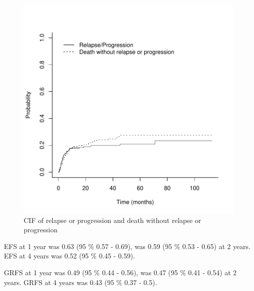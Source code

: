 \documentclass[a4paper,11pt] {article}
\begin{document}
\begin{figure}[h]
\begin{center}
\includegraphics{Rapport-fig6}
\end{center}
\caption{CIF of relapse or progression and death without relapse or progression}
\label{fig6}
\end{figure}


\pagebreak
EFS at 1 year was 0.63 (95 \% 0.57 - 0.69), was 0.59 (95 \% 0.53 - 0.65) at 2 years. EFS at 4 years was 0.52 (95 \% 0.45 - 0.59).


GRFS at 1 year was 0.49 (95 \% 0.44 - 0.56), was 0.47 (95 \% 0.41 - 0.54) at 2 years. GRFS at 4 years was 0.43 (95 \% 0.37 - 0.5).
\end{document}
